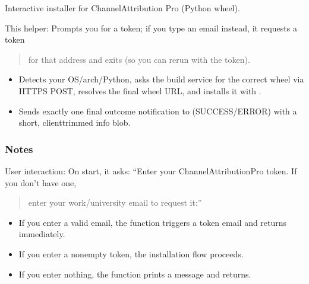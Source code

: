 \documentclass[letterpaper,10pt,english]{sphinxmanual}
\begin{document}
\begin{fulllineitems}
\label{\detokenize{index:ChannelAttribution.install_pro}}
\pysigstartsignatures
\pysiglinewithargsret
{}
{}
{}
\pysigstopsignatures
\sphinxAtStartPar
Interactive installer for ChannelAttribution Pro (Python wheel).

\sphinxAtStartPar
This helper:
\sphinxhyphen{} Prompts you for a token; if you type an email instead, it requests a token
\begin{quote}

\sphinxAtStartPar
for that address and exits (so you can rerun with the token).
\end{quote}
\begin{itemize}
\item {} 
\sphinxAtStartPar
Detects your OS/arch/Python, asks the build service for the correct wheel via HTTPS POST,
resolves the final wheel URL, and installs it with .

\item {} 
\sphinxAtStartPar
Sends exactly one final outcome notification to  (SUCCESS/ERROR)
with a short, client\sphinxhyphen{}trimmed info blob.

\end{itemize}
\subsubsection*{Notes}

\sphinxAtStartPar
User interaction:
\sphinxhyphen{} On start, it asks: “Enter your ChannelAttributionPro token. If you don’t have one,
\begin{quote}

\sphinxAtStartPar
enter your work/university email to request it:”
\end{quote}
\begin{itemize}
\item {} 
\sphinxAtStartPar
If you enter a valid email, the function triggers a token email and returns immediately.

\item {} 
\sphinxAtStartPar
If you enter a non\sphinxhyphen{}empty token, the installation flow proceeds.

\item {} 
\sphinxAtStartPar
If you enter nothing, the function prints a message and returns.


\end{itemize}
\end{fulllineitems}
\end{document}
